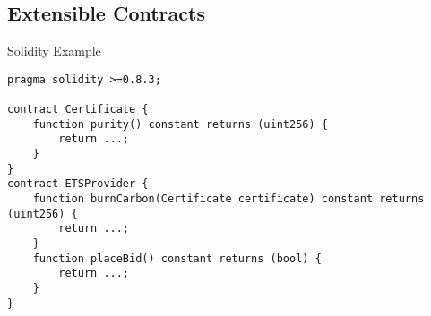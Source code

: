 \subsection{Extensible Contracts}
\begin{frame}[fragile]{Solidity Example}
    \begin{lstlisting}[language=Solidity]
pragma solidity >=0.8.3;

contract Certificate {
	function purity() constant returns (uint256) {
	    return ...;
	}
}
contract ETSProvider {
    function burnCarbon(Certificate certificate) constant returns (uint256) {
        return ...;
    }
    function placeBid() constant returns (bool) {
        return ...;
    }
}
\end{lstlisting}
\end{frame}